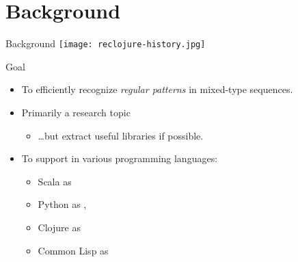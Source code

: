 \section{Background}
{  %
\begin{frame}{Background}
  \centering
  \texttt{[image: reclojure-history.jpg]}
\end{frame}
}

\begin{frame}{Goal}
  \begin{itemize}
  \item To efficiently recognize \emph{regular patterns} in mixed-type sequences.
  \item Primarily a research topic
    \begin{itemize}
    \item \ldots but extract useful libraries if possible.
    \end{itemize}
  \item To support in various programming languages:
    \begin{itemize}
    \item Scala as 
    \item Python as , 
    \item Clojure as 
    \item Common Lisp as 
    \end{itemize}

  \end{itemize}
\end{frame}



